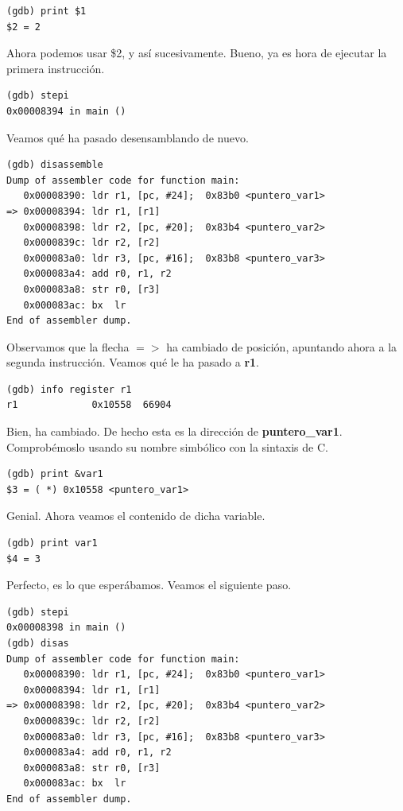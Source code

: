 \begin{lstlisting}
(gdb) print $1
$2 = 2
\end{lstlisting}

Ahora podemos usar \$2, y así sucesivamente. Bueno, ya es hora de ejecutar la primera
instrucción.

\begin{lstlisting}
(gdb) stepi
0x00008394 in main ()
\end{lstlisting}

Veamos qué ha pasado desensamblando de nuevo.

\begin{lstlisting}
(gdb) disassemble
Dump of assembler code for function main:
   0x00008390: ldr r1, [pc, #24];  0x83b0 <puntero_var1>
=> 0x00008394: ldr r1, [r1]
   0x00008398: ldr r2, [pc, #20];  0x83b4 <puntero_var2>
   0x0000839c: ldr r2, [r2]
   0x000083a0: ldr r3, [pc, #16];  0x83b8 <puntero_var3>
   0x000083a4: add r0, r1, r2
   0x000083a8: str r0, [r3]
   0x000083ac: bx  lr
End of assembler dump.
\end{lstlisting}

Observamos que la flecha {\bf $=>$} ha cambiado de posición, apuntando ahora
a la segunda instrucción. Veamos qué le ha pasado a {\bf r1}.

\begin{lstlisting}
(gdb) info register r1
r1             0x10558  66904
\end{lstlisting}

Bien, ha cambiado. De hecho esta es la dirección de {\bf puntero\_var1}.
Comprobémoslo usando su nombre simbólico con la sintaxis de C.

\begin{lstlisting}
(gdb) print &var1
$3 = ( *) 0x10558 <puntero_var1>
\end{lstlisting}

Genial. Ahora veamos el contenido de dicha variable.

\begin{lstlisting}
(gdb) print var1
$4 = 3
\end{lstlisting}

Perfecto, es lo que esperábamos. Veamos el siguiente paso.

\begin{lstlisting}
(gdb) stepi
0x00008398 in main ()
(gdb) disas
Dump of assembler code for function main:
   0x00008390: ldr r1, [pc, #24];  0x83b0 <puntero_var1>
   0x00008394: ldr r1, [r1]
=> 0x00008398: ldr r2, [pc, #20];  0x83b4 <puntero_var2>
   0x0000839c: ldr r2, [r2]
   0x000083a0: ldr r3, [pc, #16];  0x83b8 <puntero_var3>
   0x000083a4: add r0, r1, r2
   0x000083a8: str r0, [r3]
   0x000083ac: bx  lr
End of assembler dump.
\end{lstlisting}

